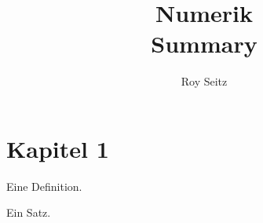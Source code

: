 

\author{Roy Seitz}
\title{Numerik\\Summary}

\maketitle
\tableofcontents

\section{Kapitel 1}
\begin{definition}
  Eine Definition.
\end{definition}

\begin{satz}
  Ein Satz.
\end{satz}



